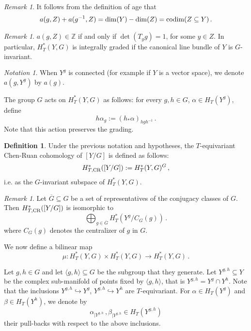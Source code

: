 \documentclass[a4paper,reqno]{amsart}
\theoremstyle{plain} %
\theoremstyle{definition} %
\newtheorem{dfn}[thm]{Definition}
\theoremstyle{remark} %
\newtheorem{rmk}[thm]{Remark}
\newtheorem{notat}{Notation}
\newcommand{\Z}{\mathbb{Z}}
\newcommand{\1}{\mathds{1}}   %
\begin{document}
\begin{rmk}
It follows from the definition of age that
$$
a(g, Z) + a(g^{-1}, Z) = \dim (Y) - \dim (Z) = {\rm codim} (Z\subseteq Y) \, .
$$
\end{rmk}
\begin{rmk}
$a(g, Z) \in \Z$ if and only if $\det (T_y g)=1$, for some $y\in Z$.
In particular, $H_T^*(Y, G)$ is integrally graded if the canonical line bundle of $Y$ is $G$-invariant.
\end{rmk}

\begin{notat}
When $Y^g$ is connected (for example if $Y$ is a vector space), we denote $a(g, Y^g)$ by $a(g)$.
\end{notat}

The group $G$ acts on $H_T^*(Y, G)$ as follows: for every $g, h \in G$, $\alpha \in H_T(Y^g)$, define 
$$
h \alpha_g := (h_* \alpha)_{hgh^{-1}} \, .
$$ 
Note that this action preserves the grading.

\begin{dfn}\label{TCR}
Under the previous notation and hypotheses, the $T$-equivariant Chen-Ruan cohomology of $[Y/G]$ is defined as follows:
$$
H^*_{T, {\rm CR}}([Y/G]) := H^*_T(Y, G)^G \, ,
$$
i.e. as the $G$-invariant subspace of $H^*_T(Y, G)$.
\end{dfn}

\begin{rmk}\label{rmkTCR}
Let $\overline{G} \subseteq G$ be a set of representatives of the conjugacy classes of $G$.
Then $H^\ast_{T, {\rm CR}}([Y/G])$ is isomorphic to
$$
\bigoplus_{g\in \overline{G}} H_T^\ast\left(Y^g/C_G(g)\right) \, .
$$ 
where $C_G(g)$ denotes the centralizer of $g$ in $G$.
\end{rmk}

We  now define a bilinear map 
$$
\mu \colon H^*_T(Y, G) \times H^*_T(Y, G) \to H^*_T(Y, G) \, .
$$

Let $g, h \in G$ and let $\langle g, h\rangle \subseteq G$ be the subgroup that they generate.
Let $Y^{g,h} \subseteq Y$ be the complex sub-manifold of points fixed by $\langle g, h\rangle$, that is $Y^{g,h}=Y^g\cap Y^h$.
Note that the inclusions $Y^{g,h} \hookrightarrow Y^g$, $Y^{g,h} \hookrightarrow Y^h$ are $T$-equivariant.
For  $\alpha \in H_T(Y^g)$ and $\beta \in H_T(Y^h)$, we denote by 
$$
\alpha_{|Y^{g,h}} \, , \beta_{|Y^{g,h}} \in H_T(Y^{g,h})
$$
their pull-backs with respect to the above inclusions.
\end{document}

